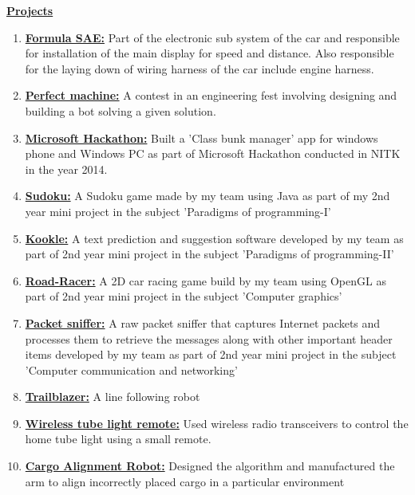 \documentclass[10pt]{article}
\begin{document}
		\underline{\textbf{\Large{Projects}}}
		\begin{enumerate}
			\item{\underline{\textbf{\large{Formula SAE:}}} Part of the electronic sub system of the car and responsible for installation of the main display for speed and distance. Also responsible for the laying down of wiring harness of the car include engine harness.}
			\item{\underline{\textbf{\large{Perfect machine:}}} A contest in an engineering fest involving designing and building a bot solving a given solution.}
			\item{\underline{\textbf{\large{Microsoft Hackathon:}}} Built a 'Class bunk manager' app for windows phone and Windows PC as part of Microsoft Hackathon conducted in NITK in the year 2014.}
			\item{\underline{\textbf{\large{Sudoku:}}} A Sudoku game made by my team using Java as part of my 2nd year mini project in the subject 'Paradigms of programming-I'}
			\item{\underline{\textbf{\large{Kookle:}}} A text prediction and suggestion software developed by my team as part of 2nd year mini project in the subject 'Paradigms of programming-II'}
			\item{\underline{\textbf{\large{Road-Racer:}}} A 2D car racing game build by my team using OpenGL as part of 2nd year mini project in the subject 'Computer graphics'}
			\item{\underline{\textbf{\large{Packet sniffer:}}} A raw packet sniffer that captures Internet packets and processes them to retrieve the messages along with other important header items developed by my team as part of 2nd year mini project in the subject 'Computer communication and networking'}
			\item{\underline{\textbf{\large{Trailblazer:}}} A line following robot}
			\item{\underline{\textbf{\large{Wireless tube light remote:}}} Used wireless radio transceivers to control the home tube light using a small remote.}
			\item{\underline{\textbf{\large{Cargo Alignment Robot:}}} Designed the algorithm and manufactured the arm to align incorrectly placed cargo in a particular environment} 
		\end{enumerate}
		
		
		\hfill\\
		\hfill\\
		\\ \\
		
\end{document}
